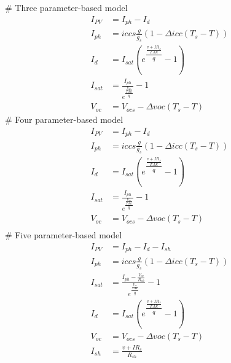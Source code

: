 # Three parameter-based model
\begin{align}
I_{PV} &= I_{ph} - I_d\\
I_{ph} &= iccs\frac{g}{g_s}(1-\Delta icc(T_s - T))\\
I_d & = I_{sat}({e^\dfrac{\frac{v+IR_{s}}{TAk}}{q}}- 1)\\
I_{sat} & = \frac{I_{ph}}{e^\dfrac{\frac{V_{oc}}{TAk}}{q}}-1\\
V_{oc} & =V_{ocs}-\Delta voc(T_s - T)
\end{align}
# Four parameter-based model
\begin{align}
I_{PV} &= I_{ph} - I_d\\
I_{ph} &= iccs\frac{g}{g_s}(1-\Delta icc(T_s - T))\\
I_d & = I_{sat}({e^\dfrac{\frac{v+IR_{s}}{TAk}}{q}}- 1)\\
I_{sat} & = \frac{I_{ph}}{e^\dfrac{\frac{V_{oc}}{TAk}}{q}}-1\\
V_{oc} & =V_{ocs}-\Delta voc(T_s - T)\\
\end{align}
# Five parameter-based model
\begin{align}
I_{PV} &= I_{ph} - I_d - I_{sh}\\
I_{ph} &= iccs\frac{g}{g_s}(1-\Delta icc(T_s - T))\\
I_{sat} &= \frac{{I_{ph}}-\frac{V_{oc}}{R_{sh}}}{e^\dfrac{\frac{V_{oc}}{TAk}}{q}}-1\\
I_d &= I_{sat}({e^\dfrac{\frac{v+IR_s}{TAk}}{q}}-1)\\
V_{oc} &= V_{ocs}-\Delta voc(T_s - T)\\
I_{sh} &= \frac{v+ IR_s}{R_{sh}}
\end{align}
